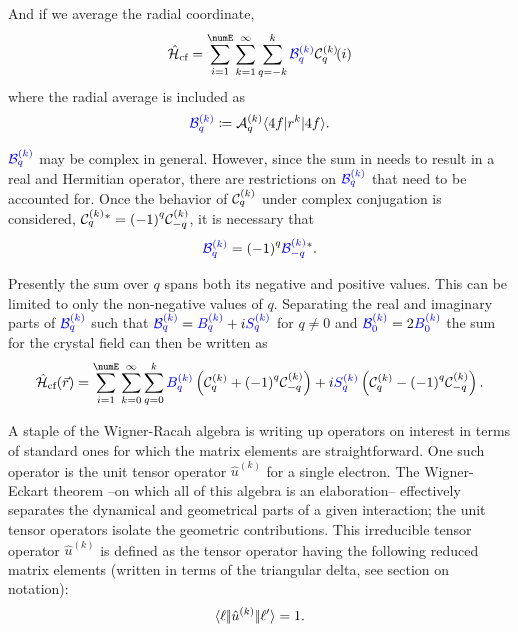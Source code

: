 \documentclass{article}
\begin{document}
    And if we average the radial coordinate,
    \begin{equation}
        \hamCrystalFieldSymbol = \sum_{i=1}^\numE \sum_{k=1}^\infty \sum_{q=-k}^{k} \Bcomplexkq{k}{q} {\Ckq{k}{q}}\!(i) 
    \end{equation}
    where the radial average is included as
    \begin{equation}
    \textcolor{blue}{\mathcal{B}^{(k)}_{q}} \coloneqq \mathcal{A}^{(k)}_q {\langle 4f | r^k | 4f\rangle}.
    \end{equation}
    
    $\textcolor{blue}{\mathcal{B}^{(k)}_{q}}$ may be complex in general. However, since the sum in  needs to result in a real and Hermitian operator, there are restrictions on $\textcolor{blue}{\mathcal{B}^{(k)}_{q}}$ that need to be accounted for. Once the behavior of $\mathcal{C}^{(k)}_{q}$ under complex conjugation is considered, $\mathcal{C}^{(k)}_{q}{}^* = {(-1)}^{q}\mathcal{C}^{(k)}_{-q}$, it is necessary that
    \begin{equation}
    	\textcolor{blue}{\mathcal{B}^{(k)}_{q}} = {(-1)}^{q}\textcolor{blue}{\mathcal{B}^{(k)}_{-q}}^{*}.
    \end{equation}
    
    Presently the sum over $q$ spans both its negative and positive values. This can be limited to only the non-negative values of $q$. Separating the real and imaginary parts of $\textcolor{blue}{\mathcal{B}^{(k)}_{q}}$ such that $\textcolor{blue}{\mathcal{B}^{(k)}_{q}} = \textcolor{blue}{B^{(k)}_{q}} + i \textcolor{blue}{S^{(k)}_{q}}$ for $q\neq{0}$ and $\textcolor{blue}{\mathcal{B}^{(k)}_{0}} = 2\textcolor{blue}{B^{(k)}_{0}}$ the sum for the crystal field can then be written as
    \begin{equation}
        \hamCrystalFieldSymbol(\vec{r}) = 
        	\sum_{i=1}^\numE
        	\sum_{k=0}^\infty
        	\sum_{q=0}^{k} \Bkq{k}{q} \left(\Ckq{k}{q} + \phaser{q}\Ckq{k}{-q}\right) + i \Skq{k}{q} \left(\Ckq{k}{q} - \phaser{q}\Ckq{k}{-q}\right).
    \label{eqn:better crystal sum}
    \end{equation}
    
    A staple of the Wigner-Racah algebra is writing up operators on interest in terms of standard ones for which the matrix elements are straightforward.  One such operator is the unit tensor operator $\hat{u}^{(k)}$ for a single electron. The Wigner-Eckart theorem --on which all of this algebra is an elaboration-- effectively separates the dynamical and geometrical parts of a given interaction; the unit tensor operators isolate the geometric contributions. This irreducible tensor operator $\hat{u}^{(k)}$ is defined as the tensor operator having the following reduced matrix elements (written in terms of the triangular delta, see section on notation):
    \begin{equation}
    \langle \ell|\!|\hat{u}^{(k)}|\!|\ell'\rangle = 1.
    \end{equation}
\end{document}
